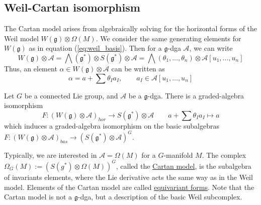 \subsection{Weil-Cartan isomorphism}
The Cartan model arises from algebraically solving for the horizontal forms of the
Weil model $W(\mathfrak{g})\otimes \Omega(M)$. 
We consider the same generating elements for $W(\mathfrak{g})$ as in equation 
(\ref{eq:weil_basis}). Then for a $\mathfrak{g}$-dga  $\mathcal{A}$, we can write 
\[
	W(\mathfrak{g})\otimes \mathcal{A} 
	= \bigwedge(\mathfrak{g}^*) \otimes S(\mathfrak{g}^*) \otimes \mathcal{A}
	= \bigwedge(\theta_1,\ldots,\theta_n) \otimes \mathcal{A}[u_1,\ldots,u_n]
\] 
Thus, an element $\alpha\in W(\mathfrak{g})\otimes \mathcal{A}$ can be written as 
\[
	\alpha = a + \sum \theta_{I}a_I, \qquad a_I \in \mathcal{A}[u_1,\ldots,u_n]
\] 
\begin{thm} \label{thm:weil_cartan_iso} %
	Let $G$ be a connected Lie group, and $\mathcal{A}$ be a $\mathfrak{g}$-dga. 
	There is a graded-algebra isomorphism 
	\[
		F : (W(\mathfrak{g})\otimes \mathcal{A})_{hor} 
		\to S(\mathfrak{g}^*)\otimes \mathcal{A} 
		\qquad a+ \sum \theta_I a_I \mapsto a
	\] 
	which induces a graded-algebra isomorphism on the basic subalgebras
	$F : (W(\mathfrak{g})\otimes \mathcal{A})_{bas} \to (S(\mathfrak{g}^*)\otimes
	\mathcal{A})^G$. 
\end{thm}
Typically, we are interested in $\mathcal{A}=\Omega(M)$ for a $G$-manifold  $M$.
The complex $\Omega_G(M):=(S(g^*)\otimes \Omega(M))^G$, called the 
\underline{Cartan model}, is the subalgebra of invariants elements, where the
Lie derivative acts the same way as in the Weil model. 
Elements of the Cartan model are called 
\underline{equivariant forms}.  
Note that the Cartan model is not a $\mathfrak{g}$-dga, but a description 
of the basic Weil subcomplex.
